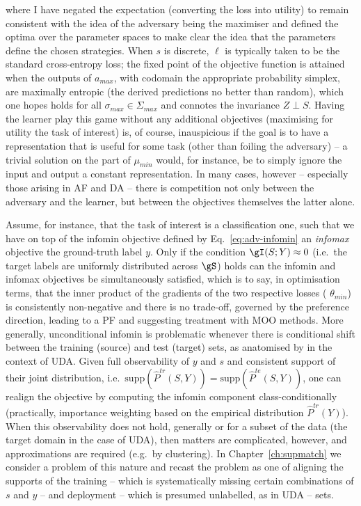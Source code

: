 %
where I have negated the expectation (converting the loss into utility) to remain consistent with
the idea of the adversary being the maximiser and defined the optima over the parameter spaces to
make clear the idea that the parameters define the chosen strategies. 
%
When \(s\) is discrete, \(\ell\) is typically taken to be the standard cross-entropy loss; the
fixed point of the objective function is attained when the outputs of \(a_{max}\), with codomain
the appropriate probability simplex, are maximally entropic (the derived predictions no better than
random), which one hopes holds for all \(\sigma_{max} \in \Sigma_{max}\) and connotes the
invariance \(Z \perp S\).
%
%
Having the learner play this game without any additional objectives (maximising for utility \wrt{}
the task of interest) is, of course, inauspicious if the goal is to have a representation that is
useful for some task (other than foiling the adversary) -- a trivial solution on the part of
\(\mu_{min}\) would, for instance, be to simply ignore the input and output a constant
representation.
%
In many cases, however -- especially those arising in \ac{AF} and \ac{DA} -- there is competition not
only between the adversary and the learner, but between the objectives themselves \wrt{} the latter
alone.
%

Assume, for instance, that the task of interest is a classification one, such that we have on top
of the infomin objective defined by Eq.~\ref{eq:adv-infomin} an \emph{infomax} objective \wrt{} the
ground-truth label \(y\).
%
Only if the condition \( \gI(S; Y) \approx 0 \) (i.e.\ the target labels are uniformly distributed
across \(\gS\)) holds can the infomin and infomax objectives be simultaneously satisfied, which is
to say, in optimisation terms, that the inner product of the gradients of the two respective losses
(\wrt{} \(\theta_{min}\)) is consistently non-negative and there is no trade-off, governed by the
preference direction, leading to a \ac{PF} and suggesting treatment with \ac{MOO} methods.
%
More generally, unconditional infomin is problematic whenever there is conditional shift between
the training (source) and test (target) sets, as anatomised by \citet{zhao2019learning} in the
context of \ac{UDA}. 
%
Given full observability of \(y\) and \(s\) and consistent support of their joint distribution,
i.e.\ \(\text{supp}(\hat{P}^{tr}(S, Y)) = \text{supp}(\hat{P}^{te}(S, Y))\), one can realign the
objective by computing the infomin component class-conditionally (practically, importance weighting
based on the empirical distribution \(\hat{P}^{tr}(Y)\)). 
%
When this observability does not hold, generally or for a subset of the data (the target domain in
the case of \ac{UDA}), then matters are complicated, however, and approximations are required
(e.g.\ by clustering).
%
In Chapter~\ref{ch:supmatch} we consider a problem of this nature and recast the problem as one of
aligning the supports of the training -- which is systematically missing certain combinations of
\(s\) and \(y\) -- and deployment -- which is presumed unlabelled, as in \ac{UDA} -- sets.

